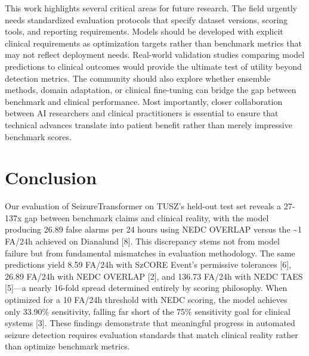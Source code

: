 This work highlights several critical areas for future research. The
field urgently needs standardized evaluation protocols that specify
dataset versions, scoring tools, and reporting requirements. Models
should be developed with explicit clinical requirements as optimization
targets rather than benchmark metrics that may not reflect deployment
needs. Real-world validation studies comparing model predictions to
clinical outcomes would provide the ultimate test of utility beyond
detection metrics. The community should also explore whether ensemble
methods, domain adaptation, or clinical fine-tuning can bridge the gap
between benchmark and clinical performance. Most importantly, closer
collaboration between AI researchers and clinical practitioners is
essential to ensure that technical advances translate into patient
benefit rather than merely impressive benchmark scores.

\hypertarget{conclusion}{%
\section{Conclusion}\label{conclusion}}

Our evaluation of SeizureTransformer on TUSZ's held-out test set reveals
a 27-137x gap between benchmark claims and clinical reality, with the
model producing 26.89 false alarms per 24 hours using NEDC OVERLAP
versus the \textasciitilde1 FA/24h achieved on Dianalund {[}8{]}. This
discrepancy stems not from model failure but from fundamental mismatches
in evaluation methodology. The same predictions yield 8.59 FA/24h with
SzCORE Event's permissive tolerances {[}6{]}, 26.89 FA/24h with NEDC
OVERLAP {[}2{]}, and 136.73 FA/24h with NEDC TAES {[}5{]}---a nearly
16-fold spread determined entirely by scoring philosophy. When optimized
for a 10 FA/24h threshold with NEDC scoring, the model achieves only
33.90\% sensitivity, falling far short of the 75\% sensitivity goal for
clinical systems {[}3{]}. These findings demonstrate that meaningful
progress in automated seizure detection requires evaluation standards
that match clinical reality rather than optimize benchmark metrics.

